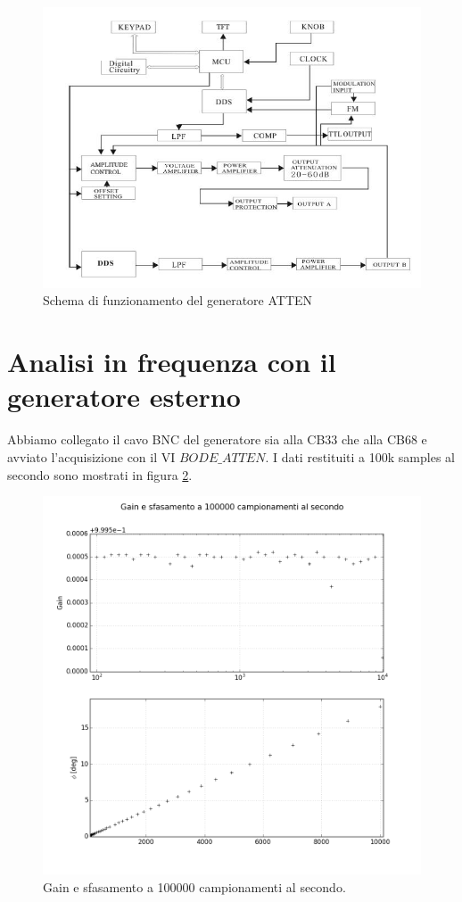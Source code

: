 \documentclass[journal, a4paper]{IEEEtran}
\begin{document}
\begin{figure}[htp]
\centering
\includegraphics[scale=.4]{circuit}
\caption{Schema di funzionamento del generatore ATTEN}
\label{fig:circuit}
\end{figure}

\section{Analisi in frequenza con il generatore esterno}

Abbiamo collegato il cavo BNC del generatore sia alla CB33 che alla CB68 e avviato l'acquisizione con il VI $BODE\_ATTEN$. I dati restituiti a 100k samples al secondo sono mostrati in figura \ref{fig:ampli100000}.

\begin{figure}[htp]
\centering
\includegraphics[scale=.3]{subplots_errors_amplitude100000}
\caption{Gain e sfasamento a 100000 campionamenti al secondo.}
\label{fig:ampli100000}
\end{figure}
\end{document}
